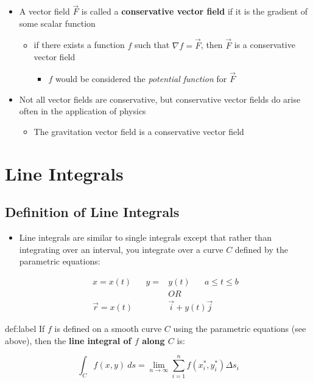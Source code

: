 \documentclass{package/notes}
\begin{document}
\begin{itemize}
	\item A vector field $\vec F$ is called a \textbf{conservative vector field} if it is the gradient of some scalar function
	\begin{itemize}
		\item if there exists a function $f$ such that $\nabla f = \vec F$, then $\vec F$ is a conservative vector field
		\begin{itemize}
			\item $f$ would be considered the \textit{potential function} for $\vec F$
		\end{itemize}
	\end{itemize}
	\item Not all vector fields are conservative, but conservative vector fields do arise often in the application of physics
	\begin{itemize}
		\item The gravitation vector field is a conservative vector field
	\end{itemize}
\end{itemize}



\section{Line Integrals}


\subsection{Definition of Line Integrals}

\begin{itemize}
	\item Line integrals are similar to single integrals except that rather than integrating over an interval, you integrate over a curve $C$ defined by the parametric equations:
	
	$$
	\begin{aligned}
		x=x(t)\;\;\;\;\;\;y=&y(t)\;\;\;\;\;\;a\le t\le b\\
		&OR\\
		\vec{r} = x(t)&\vec i + y(t)\vec j
	\end{aligned}
	$$
\end{itemize}

\begin{definition}{def:label}
	If $f$ is defined on a smooth curve $C$ using the parametric equations (see above), then the \textbf{line integral of $f$ along $C$} is:

	$$\int_Cf(x,y)\:ds = \lim_{n\to\infty}\sum_{i=1}^nf(x_i^*,y_i^*)\Delta s_i$$
\end{definition}
\end{document}
